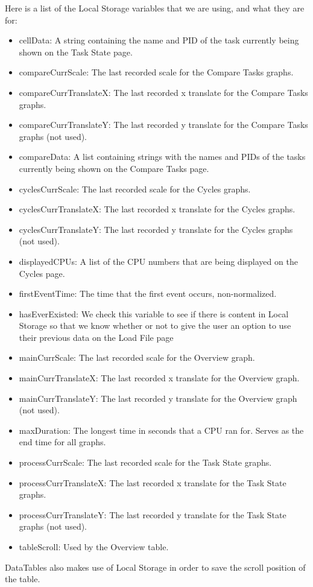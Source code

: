 \documentclass{hmcclinic}
\begin{document}
Here is a list of the Local Storage variables that we are using, and what they are for:
\begin{itemize}
\item cellData: A string containing the name and PID of the task currently being
  shown on the Task State page. 
\item compareCurrScale: The last recorded scale for the Compare Tasks graphs.
\item compareCurrTranslateX: The last recorded x translate for the Compare Tasks
  graphs.
\item compareCurrTranslateY: The last recorded y translate for the Compare Tasks
  graphs (not used).
\item compareData: A list containing strings with the names and PIDs of the
  tasks currently being shown on the Compare Tasks page.
\item cyclesCurrScale: The last recorded scale for the Cycles graphs.	
\item cyclesCurrTranslateX: The last recorded x translate for the Cycles graphs.
\item cyclesCurrTranslateY: The last recorded y translate for the Cycles graphs
  (not used).
\item displayedCPUs: A list of the CPU numbers that are being displayed on the
  Cycles page.
\item firstEventTime: The time that the first event occurs, non-normalized.
\item hasEverExisted: We check this variable to see if there is content in Local Storage so that we know whether or not to give the user an option to use their previous data on the Load File page	
\item mainCurrScale: The last recorded scale for the Overview graph.	
\item mainCurrTranslateX: The last recorded x translate for the Overview graph.
\item mainCurrTranslateY: The last recorded y translate for the Overview graph
  (not used).
\item maxDuration: The longest time in seconds that a CPU ran for. Serves as
  the end time for all graphs.
\item processCurrScale: The last recorded scale for the Task State graphs.
\item processCurrTranslateX: The last recorded x translate for the Task State
  graphs.
\item processCurrTranslateY: The last recorded y translate for the Task State
  graphs (not used).
\item tableScroll: Used by the Overview table.
\end{itemize}
DataTables also makes use of Local Storage in order to save the scroll position of the table.
\end{document}
